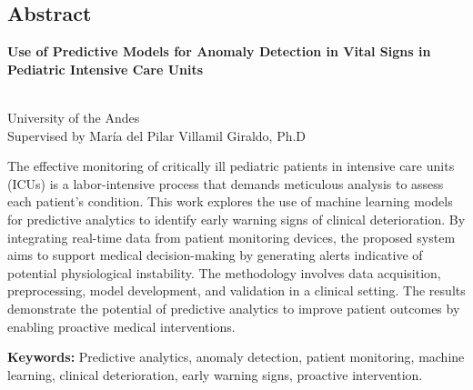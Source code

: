 \begin{titlepage}
    \centering
    \newpage
    \pagestyle{empty}

\chapter*{Abstract}
\vspace{0.8cm}

{\bf\centering Use of Predictive Models for Anomaly Detection in Vital Signs in Pediatric Intensive Care Units} \\
\vspace{0.8cm}

\begin{flushright}
    \AuthorName \\
    University of the Andes \\
    Supervised by María del Pilar Villamil Giraldo, Ph.D
\end{flushright}

\vspace{0.5cm}

\justifying The effective monitoring of critically ill pediatric patients in intensive care units (ICUs) is a labor-intensive process that demands meticulous analysis to assess each patient's condition. This work explores the use of machine learning models for predictive analytics to identify early warning signs of clinical deterioration. By integrating real-time data from patient monitoring devices, the proposed system aims to support medical decision-making by generating alerts indicative of potential physiological instability. The methodology involves data acquisition, preprocessing, model development, and validation in a clinical setting. The results demonstrate the potential of predictive analytics to improve patient outcomes by enabling proactive medical interventions.

\begin{flushleft}
\vspace{0.5cm}
\textbf{Keywords:} Predictive analytics, anomaly detection, patient monitoring, machine learning, clinical deterioration, early warning signs,  proactive intervention.

\end{flushleft}

\end{titlepage}

